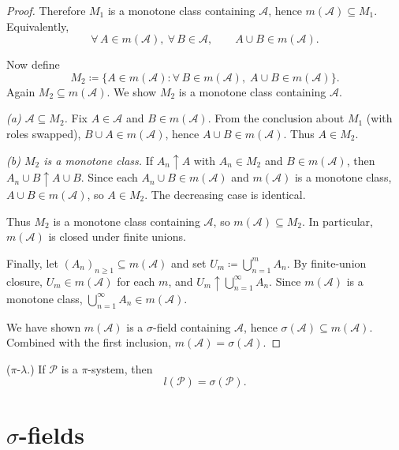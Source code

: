 \begin{proof}
	Therefore $M_1$ is a monotone class containing $\mathscr{A}$, hence $m(\mathscr{A}) \subseteq M_1$.
	Equivalently,
	\[
		\forall\,A \in m(\mathscr{A}),\ \forall\,B \in \mathscr{A},\qquad A \cup B \in m(\mathscr{A}).
	\]

	Now define
	\[
		M_2 \coloneqq \{A \in m(\mathscr{A}) : \forall\,B \in m(\mathscr{A}),\; A \cup B \in m(\mathscr{A})\}.
	\]
	Again $M_2 \subseteq m(\mathscr{A})$. We show $M_2$ is a monotone class containing $\mathscr{A}$.

	\emph{(a) $\mathscr{A} \subseteq M_2$.}
	Fix $A \in \mathscr{A}$ and $B \in m(\mathscr{A})$. From the conclusion about $M_1$ (with roles swapped),
	$B \cup A \in m(\mathscr{A})$, hence $A \cup B \in m(\mathscr{A})$. Thus $A \in M_2$.

	\emph{(b) $M_2$ is a monotone class.}
	If $A_n \uparrow A$ with $A_n \in M_2$ and $B \in m(\mathscr{A})$, then
	$A_n \cup B \uparrow A \cup B$. Since each $A_n \cup B \in m(\mathscr{A})$ and $m(\mathscr{A})$
	is a monotone class, $A \cup B \in m(\mathscr{A})$, so $A \in M_2$.
	The decreasing case is identical.

	Thus $M_2$ is a monotone class containing $\mathscr{A}$, so $m(\mathscr{A}) \subseteq M_2$.
	In particular, $m(\mathscr{A})$ is closed under finite unions.

	Finally, let $(A_n)_{n\ge1} \subseteq m(\mathscr{A})$ and set $U_m \coloneqq \bigcup_{n=1}^m A_n$.
	By finite-union closure, $U_m \in m(\mathscr{A})$ for each $m$, and $U_m \uparrow \bigcup_{n=1}^\infty A_n$.
	Since $m(\mathscr{A})$ is a monotone class, $\bigcup_{n=1}^\infty A_n \in m(\mathscr{A})$.

	We have shown $m(\mathscr{A})$ is a $\sigma$-field containing $\mathscr{A}$, hence
	$\sigma(\mathscr{A}) \subseteq m(\mathscr{A})$. Combined with the first inclusion,
	$m(\mathscr{A}) = \sigma(\mathscr{A})$.
\end{proof}
\begin{theorem}
	($\pi$-$\lambda$.) If $\mathscr{P}$ is a $\pi$-system, then \[
		l(\mathscr{P}) = \sigma(\mathscr{P})
	.\] 
\end{theorem}

\section{$\sigma$-fields}


